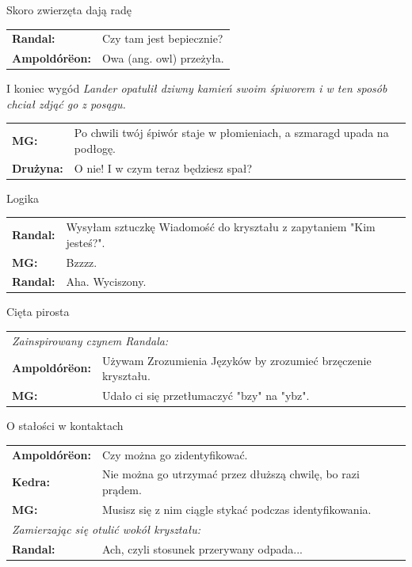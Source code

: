 \documentclass[10pt,twoside,twocolumn]{book}
\begin{document}
\begin{rpg-quotebox}{Skoro zwierzęta dają radę}
   \begin{tabularx}{\columnwidth}{lX}
\textbf{Randal:} & Czy tam jest bepiecznie?\\
\textbf{Ampoldórëon:} & Owa (ang. owl) przeżyła.\\
   \end{tabularx}
\end{rpg-quotebox}


\begin{rpg-quotebox}{I koniec wygód}
   \textit{Lander opatulił dziwny kamień swoim śpiworem i w ten sposób chciał zdjąć go z posągu.}\\

   \begin{tabularx}{\columnwidth}{lX}
      \textbf{MG:} & Po chwili twój śpiwór staje w płomieniach, a szmaragd upada na podłogę.\\
      \textbf{Drużyna:} & O nie! I w czym teraz będziesz spał?\\
   \end{tabularx}
\end{rpg-quotebox}


\begin{rpg-quotebox}{Logika}
   \begin{tabularx}{\columnwidth}{lX}
      \textbf{Randal:} & Wysyłam sztuczkę Wiadomość do kryształu z zapytaniem "Kim jesteś?".\\
      \textbf{MG:} & Bzzzz.\\
      \textbf{Randal:} & Aha. Wyciszony.\\
   \end{tabularx}
\end{rpg-quotebox}


\begin{rpg-quotebox}{Cięta pirosta}
   \begin{tabularx}{\columnwidth}{lX}
      \multicolumn{2}{l}{\textit{Zainspirowany czynem Randala:}}\\
      \textbf{Ampoldórëon:} & Używam Zrozumienia Języków by zrozumieć brzęczenie kryształu.\\
      \textbf{MG:} & Udało ci się przetłumaczyć "bzy" na "ybz".\\
   \end{tabularx}
\end{rpg-quotebox}


\begin{rpg-quotebox}{O stałości w kontaktach}
   \begin{tabularx}{\columnwidth}{lX}
      \textbf{Ampoldórëon:} & Czy można go zidentyfikować.\\
      \textbf{Kedra:} & Nie można go utrzymać przez dłuższą chwilę, bo razi prądem.\\
      \textbf{MG:} & Musisz się z nim ciągle stykać podczas identyfikowania.\\
      \multicolumn{2}{l}{\textit{Zamierzając się otulić wokół kryształu:}}\\
      \textbf{Randal:} & Ach, czyli stosunek przerywany odpada...\\
   \end{tabularx}
\end{rpg-quotebox}
\end{document}
